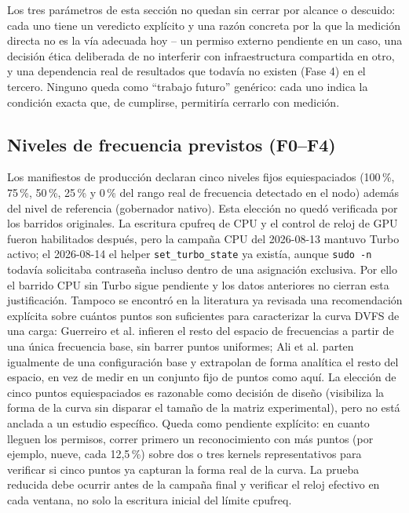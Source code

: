 Los tres parámetros de esta sección no quedan sin cerrar por alcance o
descuido: cada uno tiene un veredicto explícito y una razón concreta por
la que la medición directa no es la vía adecuada hoy -- un permiso externo
pendiente en un caso, una decisión ética deliberada de no interferir con
infraestructura compartida en otro, y una dependencia real de resultados
que todavía no existen (Fase 4) en el tercero. Ninguno queda como
``trabajo futuro'' genérico: cada uno indica la condición exacta que, de
cumplirse, permitiría cerrarlo con medición.

\subsection{Niveles de frecuencia previstos (F0--F4)}

Los manifiestos de producción declaran cinco niveles fijos equiespaciados
(100\,\%, 75\,\%, 50\,\%, 25\,\% y 0\,\% del rango real de frecuencia
detectado en el nodo) además del nivel de referencia (gobernador nativo).
Esta elección no quedó verificada por los barridos originales. La escritura
cpufreq de CPU y el control de reloj de GPU fueron habilitados después, pero
la campaña CPU del 2026-08-13 mantuvo Turbo activo; el 2026-08-14 el helper
\texttt{set\_turbo\_state} ya existía, aunque \texttt{sudo -n} todavía
solicitaba contraseña incluso dentro de una asignación exclusiva. Por ello
el barrido CPU sin Turbo sigue pendiente y los datos anteriores no cierran
esta justificación. Tampoco se encontró en la literatura ya
revisada una recomendación explícita sobre cuántos puntos son suficientes
para caracterizar la curva DVFS de una carga: Guerreiro et al.
\citep{Guerreiro2019} infieren el resto del espacio de frecuencias a partir
de una única frecuencia base, sin barrer puntos uniformes; Ali et al.
\citep{Ali2023} parten igualmente de una configuración base y extrapolan de
forma analítica el resto del espacio, en vez de medir en un conjunto fijo
de puntos como aquí. La elección de cinco puntos equiespaciados es
razonable como decisión de diseño (visibiliza la forma de la curva sin
disparar el tamaño de la matriz experimental), pero no está anclada a un
estudio específico. Queda como pendiente explícito: en cuanto lleguen los
permisos, correr primero un reconocimiento con más puntos (por ejemplo,
nueve, cada 12{,}5\,\%) sobre dos o tres kernels representativos para
verificar si cinco puntos ya capturan la forma real de la curva. La prueba
reducida debe ocurrir antes de la campaña final y verificar el reloj efectivo
en cada ventana, no solo la escritura inicial del límite cpufreq.

